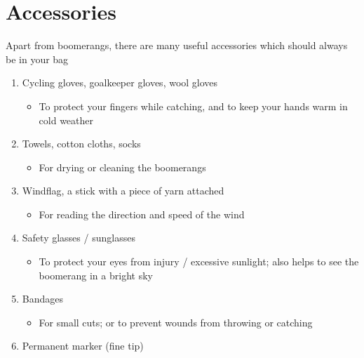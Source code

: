 \section{Accessories}
Apart from boomerangs, there are many useful accessories which should always be in your bag\\
\begin{center}
\colorbox{BOrange!30}{\parbox{30em}{
\colorbox{BOrange!30}{\parbox{29em}{
	\color{black}
	\small
	\vspace{0.2em}
\begin{enumerate}
	\setlength{\itemsep}{0.25em}
	\setlength{\parsep}{0pt}
	\setlength{\topsep}{0pt}
\item Cycling gloves, goalkeeper gloves, wool gloves
	\begin{itemize}\setlength{\itemsep}{0pt}\setlength{\parsep}{0pt}\setlength{\topsep}{0pt}
		\item[-]	To protect your fingers while catching, and to keep your hands warm in cold weather
	\end{itemize}
\item Towels, cotton cloths, socks
	\begin{itemize}\setlength{\itemsep}{0pt}\setlength{\parsep}{0pt}\setlength{\topsep}{0pt}
		\item[-] For drying or cleaning the boomerangs
	\end{itemize}
\item Windflag, a stick with a piece of yarn attached
	\begin{itemize}\setlength{\itemsep}{0pt}\setlength{\parsep}{0pt}\setlength{\topsep}{0pt}
		\item[-] For reading the direction and speed of the wind
	\end{itemize}
\item Safety glasses / sunglasses
	\begin{itemize}\setlength{\itemsep}{0pt}\setlength{\parsep}{0pt}\setlength{\topsep}{0pt}
		\item[-] To protect your eyes from injury / excessive sunlight; also helps to see the boomerang in a bright sky
	\end{itemize}
\item Bandages
	\begin{itemize}\setlength{\itemsep}{0pt}\setlength{\parsep}{0pt}\setlength{\topsep}{0pt}
		\item[-] For small cuts; or to prevent wounds from throwing or catching
	\end{itemize}
\item Permanent marker (fine tip)

\end{enumerate}}}}}
\end{center}
